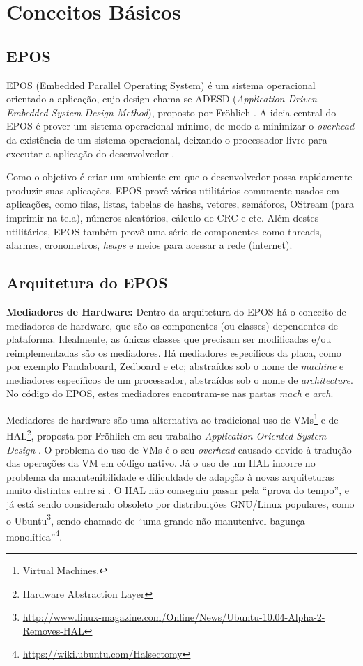 \chapter{Conceitos Básicos}

\section{EPOS}

EPOS (Embedded Parallel Operating System) é um sistema operacional orientado a aplicação, cujo design chama-se ADESD (\emph{Application-Driven Embedded System Design Method}), proposto por Fröhlich \cite{guto_thesis}. A ideia central do EPOS é prover um sistema operacional mínimo, de modo a minimizar o \emph{overhead} da existência de um sistema operacional, deixando o processador livre para executar a aplicação do desenvolvedor \cite{epos_user_guide}.

Como o objetivo é criar um ambiente em que o desenvolvedor possa rapidamente produzir suas aplicações, EPOS provê vários utilitários comumente usados em aplicações, como filas, listas, tabelas de hashs, vetores, semáforos, OStream (para imprimir na tela), números aleatórios, cálculo de CRC e etc. Além destes utilitários, EPOS também provê uma série de componentes como threads, alarmes, cronometros, \emph{heaps} e meios para acessar a rede (internet).

\section{Arquitetura do EPOS}

\textbf{Mediadores de Hardware:} Dentro da arquitetura do EPOS há o conceito de mediadores de hardware, que são os componentes (ou classes) dependentes de plataforma. Idealmente, as únicas classes que precisam ser modificadas e/ou reimplementadas são os mediadores. Há mediadores específicos da placa, como por exemplo Pandaboard, Zedboard e etc; abstraídos sob o nome de \emph{machine} e mediadores específicos de um processador, abstraídos sob o nome de \emph{architecture}. No código do EPOS, estes mediadores encontram-se nas pastas \emph{mach} e \emph{arch}.

Mediadores de hardware são uma alternativa ao tradicional uso de VMs\footnote{Virtual Machines.} e de HAL\footnote{Hardware Abstraction Layer}, proposta por Fröhlich em seu trabalho \emph{Application-Oriented System Design} \cite{guto_thesis}. O problema do uso de VMs é o seu \emph{overhead} causado devido à tradução das operações da VM em código nativo. Já o uso de um HAL incorre no problema da manutenibilidade e dificuldade de adapção à novas arquiteturas muito distintas entre si \cite{hw_mediators}. O HAL não conseguiu passar pela ``prova do tempo'', e já está sendo considerado obsoleto por distribuições GNU/Linux populares, como o 
Ubuntu\footnote{\url{http://www.linux-magazine.com/Online/News/Ubuntu-10.04-Alpha-2-Removes-HAL}}, sendo chamado de ``uma grande não-manutenível bagunça monolítica''\footnote{\url{https://wiki.ubuntu.com/Halsectomy}}.



